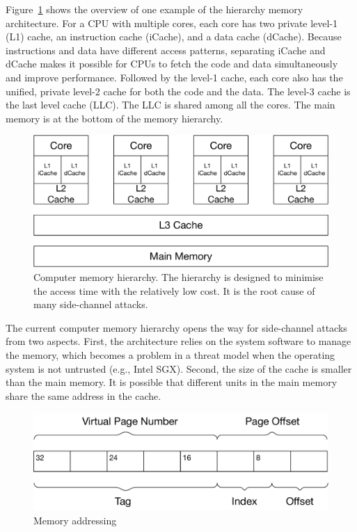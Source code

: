Figure~\ref{fig:memory_hierarchy} shows the overview of one example of the hierarchy memory architecture. For a CPU with multiple cores, each core has two private level-1 (L1) cache, an instruction cache (iCache), and a data cache (dCache). Because instructions and data have different access patterns, separating iCache and dCache makes it possible for CPUs to fetch the code and data simultaneously and improve performance. Followed by the level-1 cache, each core also has the unified, private level-2 cache for both the code and the data. The level-3 cache is the last level cache (LLC). The LLC is shared among all the cores.
The main memory is at the bottom of the memory hierarchy.
\begin{figure}[ht]
  \centering
  \includegraphics[width=.65\columnwidth]{./figures/chapter3/architecture.pdf}
  \caption{Computer memory hierarchy. The hierarchy is designed to minimise the access time with the relatively low cost. It is the root cause of many side-channel attacks.}\label{fig:memory_hierarchy}
\end{figure}

The current computer memory hierarchy opens the way for side-channel attacks from two aspects. First, the architecture relies on the system software to manage the memory, which becomes a problem in a threat model when the operating system is not untrusted (e.g., Intel SGX). Second, the size of the cache is smaller than the main memory. It is possible that different units in the main memory share the same address in the cache.
\begin{figure}[ht]
  \centering
  \includegraphics[width=.65\columnwidth]{./figures/chapter3/address.pdf}
  \caption{Memory addressing}\label{fig:memory_address}
\end{figure}

